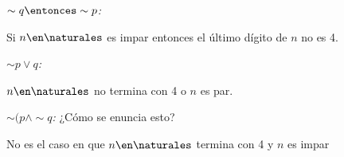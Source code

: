 \begin{enumerate}[label=\roman*)]
\begin{itemize}
                \textit{$\sim q \entonces \sim p$:}
                \begin{center}
                  Si $n \en \naturales$ es impar entonces el último dígito de $n$ no es 4.
                \end{center}

                \textit{$\sim p \lor q$:}
                \begin{center}
                  $n \en \naturales$ no termina con 4 o $n$ es par.
                \end{center}

                \textit{$\sim (p \land \sim q$:}
                ¿Cómo se enuncia esto?
                \begin{center}
                  No es el caso en que $n \en \naturales$ termina con 4 y $n$ es impar
                \end{center}
        \end{itemize}
\end{enumerate}

\begin{aportes}
  \item {}
  \item {}
  \item {}
\end{aportes}
